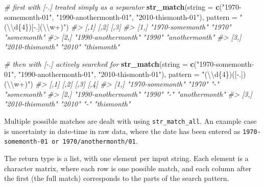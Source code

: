 \documentclass[]{book}
\newenvironment{Shaded}{}{}
\newcommand{\CharTok}[1]{\textcolor[rgb]{0.25,0.44,0.63}{#1}}
\newcommand{\CommentTok}[1]{\textcolor[rgb]{0.38,0.63,0.69}{\textit{#1}}}
\newcommand{\DataTypeTok}[1]{\textcolor[rgb]{0.56,0.13,0.00}{#1}}
\newcommand{\KeywordTok}[1]{\textcolor[rgb]{0.00,0.44,0.13}{\textbf{#1}}}
\newcommand{\NormalTok}[1]{#1}
\newcommand{\StringTok}[1]{\textcolor[rgb]{0.25,0.44,0.63}{#1}}
\begin{document}
\begin{Shaded}
\begin{Highlighting}[]
\CommentTok{# first with [-.] treated simply as a separator}
\KeywordTok{str_match}\NormalTok{(}\DataTypeTok{string =} \KeywordTok{c}\NormalTok{(}\StringTok{"1970-somemonth-01"}\NormalTok{,}
                     \StringTok{"1990-anothermonth-01"}\NormalTok{,}
                     \StringTok{"2010-thismonth-01"}\NormalTok{),}
          \DataTypeTok{pattern =} \StringTok{"(}\CharTok{\textbackslash{}\textbackslash{}}\StringTok{d\{4\})[-.](}\CharTok{\textbackslash{}\textbackslash{}}\StringTok{w+)"}\NormalTok{)}
\CommentTok{#>      [,1]                [,2]   [,3]          }
\CommentTok{#> [1,] "1970-somemonth"    "1970" "somemonth"   }
\CommentTok{#> [2,] "1990-anothermonth" "1990" "anothermonth"}
\CommentTok{#> [3,] "2010-thismonth"    "2010" "thismonth"}

\CommentTok{# then with [-.] actively searched for}
\KeywordTok{str_match}\NormalTok{(}\DataTypeTok{string =} \KeywordTok{c}\NormalTok{(}\StringTok{"1970-somemonth-01"}\NormalTok{,}
                     \StringTok{"1990-anothermonth-01"}\NormalTok{,}
                     \StringTok{"2010-thismonth-01"}\NormalTok{),}
          \DataTypeTok{pattern =} \StringTok{"(}\CharTok{\textbackslash{}\textbackslash{}}\StringTok{d\{4\})([-.])(}\CharTok{\textbackslash{}\textbackslash{}}\StringTok{w+)"}\NormalTok{)}
\CommentTok{#>      [,1]                [,2]   [,3] [,4]          }
\CommentTok{#> [1,] "1970-somemonth"    "1970" "-"  "somemonth"   }
\CommentTok{#> [2,] "1990-anothermonth" "1990" "-"  "anothermonth"}
\CommentTok{#> [3,] "2010-thismonth"    "2010" "-"  "thismonth"}
\end{Highlighting}
\end{Shaded}

Multiple possible matches are dealt with using \texttt{str\_match\_all}. An example case is uncertainty in date-time in raw data, where the date has been entered as \texttt{1970-somemonth-01\ or\ 1970/anothermonth/01}.

The return type is a list, with one element per input string. Each element is a character matrix, where each row is one possible match, and each column after the first (the full match) corresponds to the parts of the search pattern.
\end{document}
